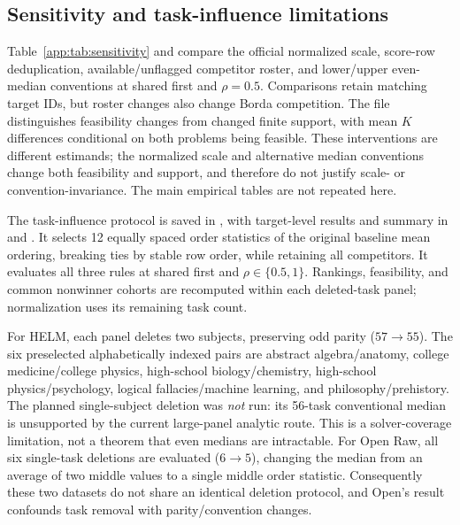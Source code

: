 \subsection{Sensitivity and task-influence limitations}
\label{app:sensitivity}\label{app:sensitivities}
\begin{table}[t]
\caption{Open LLM sensitivity at half headroom, shared first. $N$ is the retained identical-target cohort. Changed $K$ counts finite--finite changes only; feasibility changes are reported separately in the CSV.}
\label{app:tab:sensitivity}
\centering\small

\end{table}
Table~\ref{app:tab:sensitivity} and  compare the official normalized scale, score-row deduplication, available/unflagged competitor roster, and lower/upper even-median conventions at shared first and $\rho=0.5$. Comparisons retain matching target IDs, but roster changes also change Borda competition. The file distinguishes feasibility changes from changed finite support, with mean $K$ differences conditional on both problems being feasible. These interventions are different estimands; the normalized scale and alternative median conventions change both feasibility and support, and therefore do not justify scale- or convention-invariance. The main empirical tables are not repeated here.

The task-influence protocol is saved in , with target-level results and summary in  and . It selects 12 equally spaced order statistics of the original baseline mean ordering, breaking ties by stable row order, while retaining all competitors. It evaluates all three rules at shared first and $\rho\in\{0.5,1\}$. Rankings, feasibility, and common nonwinner cohorts are recomputed within each deleted-task panel; normalization uses its remaining task count.

For HELM, each panel deletes two subjects, preserving odd parity ($57\to55$). The six preselected alphabetically indexed pairs are abstract algebra/anatomy, college medicine/college physics, high-school biology/chemistry, high-school physics/psychology, logical fallacies/machine learning, and philosophy/prehistory. The planned single-subject deletion was \emph{not} run: its 56-task conventional median is unsupported by the current large-panel analytic route. This is a solver-coverage limitation, not a theorem that even medians are intractable. For Open Raw, all six single-task deletions are evaluated ($6\to5$), changing the median from an average of two middle values to a single middle order statistic. Consequently these two datasets do not share an identical deletion protocol, and Open's result confounds task removal with parity/convention changes.

